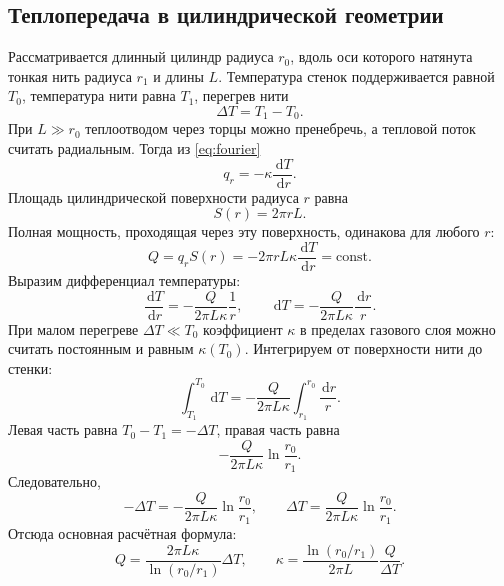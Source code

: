 \documentclass[a4paper,12pt]{article}
\newcommand{\dd}{\,\mathrm{d}}
\begin{document}
\subsection{Теплопередача в цилиндрической геометрии}
Рассматривается длинный цилиндр радиуса $r_0$, вдоль оси которого натянута тонкая нить радиуса $r_1$ и длины $L$. Температура стенок поддерживается равной $T_0$, температура нити равна $T_1$, перегрев нити
\[
\Delta T=T_1-T_0.
\]
При $L\gg r_0$ теплоотводом через торцы можно пренебречь, а тепловой поток считать радиальным. Тогда из \eqref{eq:fourier}
\begin{equation}
q_r=-\kappa\frac{\dd T}{\dd r}.
\label{eq:radial_fourier}
\end{equation}
Площадь цилиндрической поверхности радиуса $r$ равна
\[
S(r)=2\pi rL.
\]
Полная мощность, проходящая через эту поверхность, одинакова для любого $r$:
\begin{equation}
Q=q_rS(r)=-2\pi rL\kappa\frac{\dd T}{\dd r}=\mathrm{const}.
\label{eq:flow_constant}
\end{equation}
Выразим дифференциал температуры:
\[
\frac{\dd T}{\dd r}=-\frac{Q}{2\pi L\kappa}\frac{1}{r},
\qquad
\dd T=-\frac{Q}{2\pi L\kappa}\frac{\dd r}{r}.
\]
При малом перегреве $\Delta T\ll T_0$ коэффициент $\kappa$ в пределах газового слоя можно считать постоянным и равным $\kappa(T_0)$. Интегрируем от поверхности нити до стенки:
\[
\int_{T_1}^{T_0}\dd T=-\frac{Q}{2\pi L\kappa}\int_{r_1}^{r_0}\frac{\dd r}{r}.
\]
Левая часть равна $T_0-T_1=-\Delta T$, правая часть равна
\[
-\frac{Q}{2\pi L\kappa}\ln\frac{r_0}{r_1}.
\]
Следовательно,
\[
-\Delta T=-\frac{Q}{2\pi L\kappa}\ln\frac{r_0}{r_1},
\qquad
\Delta T=\frac{Q}{2\pi L\kappa}\ln\frac{r_0}{r_1}.
\]
Отсюда основная расчётная формула:
\begin{equation}
Q=\frac{2\pi L\kappa}{\ln(r_0/r_1)}\Delta T,
\qquad
\kappa=\frac{\ln(r_0/r_1)}{2\pi L}\frac{Q}{\Delta T}.
\label{eq:main}
\end{equation}
\end{document}
